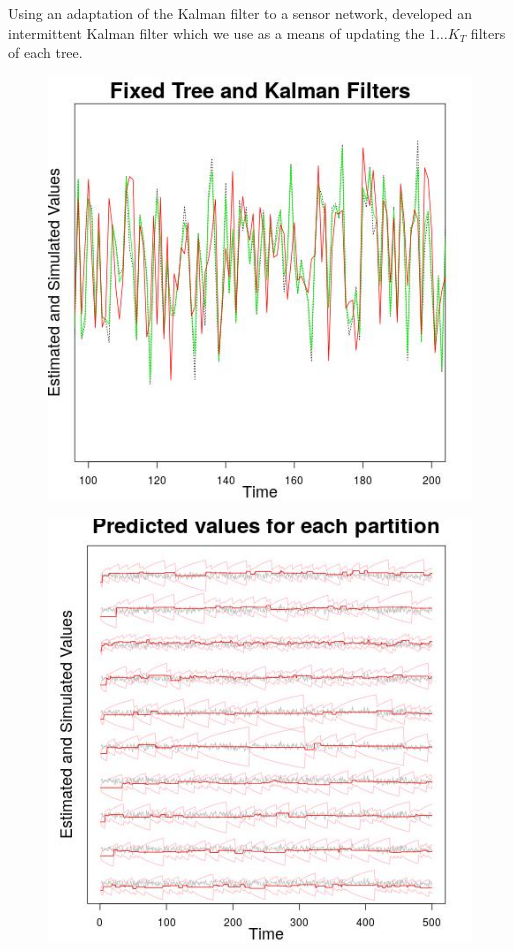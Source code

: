 \documentclass[a1paper,portrait, fontscale=0.45]{baposter}
\begin{document}
\begin{poster}
{\small{Using an adaptation of the Kalman filter to a sensor network, \cite{sinopoli} developed an intermittent Kalman filter which we use as a means of updating the $1 \dots K_T$ filters of each tree.} 
\begin{figure}[H]
\hspace{1em}
\begin{minipage}[c]{0.42\linewidth}
\includegraphics[width=\linewidth]{fixkf.jpeg}
\label{fig:fixtree1}
\end{minipage}
\hspace{1.5em}
\begin{minipage}[c]{0.42\linewidth}
\includegraphics[width=\linewidth]{fixpred.jpeg}

\end{minipage}
\end{figure}}
\end{poster}
\end{document}
